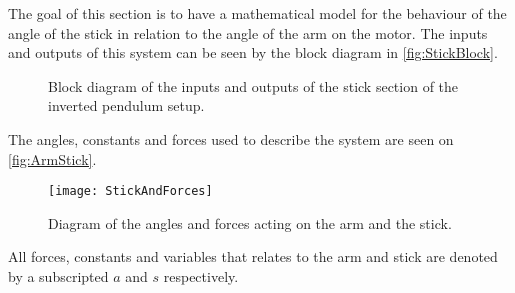 \graphicspath{{figures/modeling/ArmStick/}}
The goal of this section is to have a mathematical model for the behaviour of the angle of the stick in relation to the angle of the arm on the motor. The inputs and outputs of this system can be seen by the block diagram in \autoref{fig:StickBlock}.
\begin{figure}
\centering
{}
\caption{Block diagram of the inputs and outputs of the stick section of the inverted pendulum setup.}
\label{fig:StickBlock}
\end{figure}

The angles, constants and forces used to describe the system are seen on \autoref{fig:ArmStick}.
\begin{figure}[htbp]
\centering
\texttt{[image: StickAndForces]}
\caption{Diagram of the angles and forces acting on the arm and the stick.}
\label{fig:ArmStick}
\end{figure}
\startexplain
\stopexplain
All forces, constants and variables that relates to the arm and stick are denoted by a subscripted $a$ and $s$ respectively. 

